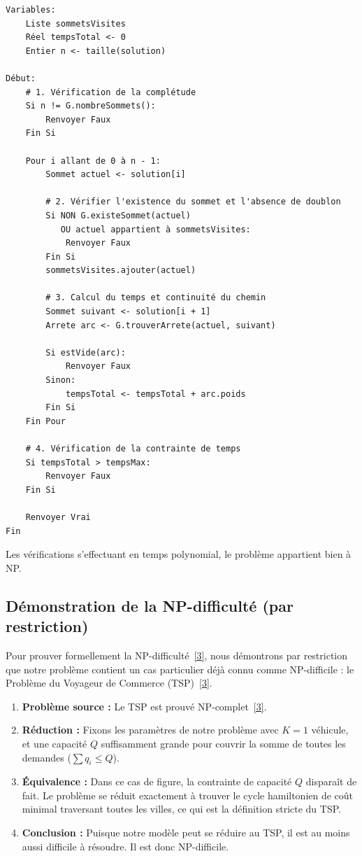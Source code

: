 \begin{lstlisting}[caption={Algorithme de vérification de solution},breaklines=true]
Variables:
    Liste sommetsVisites
    Réel tempsTotal <- 0
    Entier n <- taille(solution)

Début:
    # 1. Vérification de la complétude
    Si n != G.nombreSommets():
        Renvoyer Faux
    Fin Si

    Pour i allant de 0 à n - 1:
        Sommet actuel <- solution[i]

        # 2. Vérifier l'existence du sommet et l'absence de doublon
        Si NON G.existeSommet(actuel)
           OU actuel appartient à sommetsVisites:
            Renvoyer Faux
        Fin Si
        sommetsVisites.ajouter(actuel)

        # 3. Calcul du temps et continuité du chemin
        Sommet suivant <- solution[i + 1]
        Arrete arc <- G.trouverArrete(actuel, suivant)

        Si estVide(arc):
            Renvoyer Faux
        Sinon:
            tempsTotal <- tempsTotal + arc.poids
        Fin Si
    Fin Pour

    # 4. Vérification de la contrainte de temps
    Si tempsTotal > tempsMax:
        Renvoyer Faux
    Fin Si

    Renvoyer Vrai
Fin
\end{lstlisting}

\vspace{0.5cm}

\noindent Les vérifications s'effectuant en temps polynomial, le problème appartient bien à NP.

\newpage

\subsection{Démonstration de la NP-difficulté (par restriction)}

Pour prouver formellement la NP-difficulté~\hyperlink{ref:garey1979}{[3]}, nous démontrons par restriction que notre problème contient un cas particulier déjà connu comme NP-difficile : le Problème du Voyageur de Commerce (TSP)~\hyperlink{ref:garey1979}{[3]}.
\begin{enumerate}
    \item \textbf{Problème source :} Le TSP est prouvé NP-complet~\hyperlink{ref:garey1979}{[3]}.
    \item \textbf{Réduction :} Fixons les paramètres de notre problème avec $K = 1$ véhicule, et une capacité $Q$ suffisamment grande pour couvrir la somme de toutes les demandes ($\sum q_i \leq Q$).
    \item \textbf{Équivalence :} Dans ce cas de figure, la contrainte de capacité $Q$ disparaît de fait. Le problème se réduit exactement à trouver le cycle hamiltonien de coût minimal traversant toutes les villes, ce qui est la définition stricte du TSP.
    \item \textbf{Conclusion :} Puisque notre modèle peut se réduire au TSP, il est au moins aussi difficile à résoudre. Il est donc NP-difficile.
\end{enumerate}

